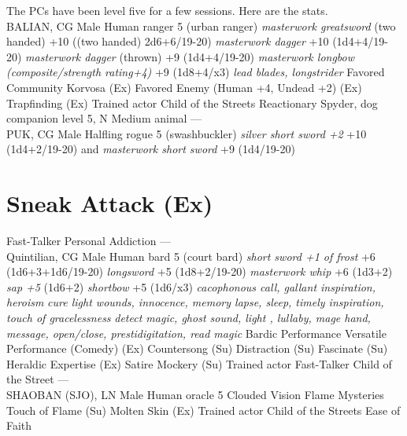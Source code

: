 The PCs have been level five for a few sessions. Here are the stats.\\

BALIAN, CG Male Human ranger 5 (urban ranger)        {\itshape masterwork greatsword} (two handed) +10 ((two handed) 2d6+6/19-20)   {\itshape masterwork dagger} +10 (1d4+4/19-20)   {\itshape masterwork dagger} (thrown) +9 (1d4+4/19-20)   {\itshape masterwork longbow (composite/strength rating+4)} +9 (1d8+4/x3)     {\itshape lead blades, longstrider}        Favored Community Korvosa (Ex)  Favored Enemy (Human +4, Undead +2) (Ex)  Trapfinding (Ex) Trained actor  Child of the Streets  Reactionary Spyder, dog companion level 5, N Medium animal           ---\\

PUK, CG Male Halfling rogue 5 (swashbuckler)        {\itshape silver short sword +2} +10 (1d4+2/19-20) and  {\itshape masterwork short sword} +9 (1d4/19-20)         \section{Sneak Attack (Ex)}

Fast-Talker  Personal Addiction ---\\

Quintilian, CG Male Human bard 5 (court bard)        {\itshape short sword +1 of frost} +6 (1d6+3+1d6/19-20)   {\itshape longsword} +5 (1d8+2/19-20)   {\itshape masterwork whip} +6 (1d3+2)   {\itshape sap +5} (1d6+2)   {\itshape shortbow} +5 (1d6/x3)     {\itshape cacophonous call, gallant inspiration, heroism}    {\itshape cure light wounds, innocence, memory lapse, sleep, timely inspiration, touch of gracelessness}    {\itshape detect magic, ghost sound, light , lullaby, mage hand, message, open/close, prestidigitation, read magic}      Bardic Performance  Versatile Performance (Comedy) (Ex)  Countersong (Su)  Distraction (Su)  Fascinate (Su)  Heraldic Expertise (Ex)  Satire  Mockery (Su) Trained actor  Fast-Talker  Child of the Street ---\\

SHAOBAN (SJO), LN Male Human oracle 5                Clouded Vision  Flame Mysteries  Touch of Flame (Su)   Molten Skin (Ex) Trained actor  Child of the Streets  Ease of Faith 
